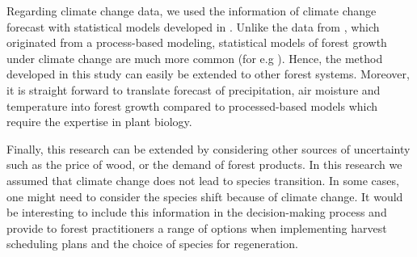 \documentclass[forests,article,submit,moreauthors,pdftex]{Definitions/mdpi}
\begin{document}
Regarding climate change data, we  used the information of climate change forecast with statistical models developed in \cite{Latta2009}. Unlike the data from \cite{Garcia-Gonzalo2016,Alvarez-Miranda2018, Garcia-Gonzalo2020}, which originated from a process-based modeling, statistical models of forest growth under climate change are much more common (for e.g \cite{Elli2020}). Hence, the method developed in this study can easily be extended to other forest systems. Moreover, it is straight forward to translate forecast of precipitation, air moisture and temperature into forest growth compared to processed-based models which require the expertise in plant biology.

Finally, this research can be extended by considering other sources of uncertainty such as the price of wood, or the demand of forest products. In this research we assumed that climate change does not lead to species transition. In some cases, one might need to consider the species shift because of climate change. It would be interesting to include this information in the decision-making process and provide to forest practitioners a range of options when implementing harvest scheduling plans and the choice of species for regeneration.

\vspace{6pt} 








\appendix
\end{document}
